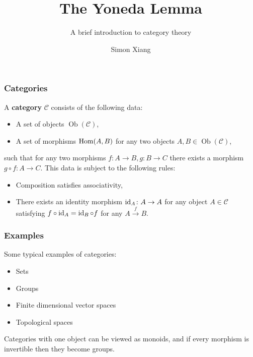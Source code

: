 \documentclass[xcolor=dvipsnames]{beamer}
\title{The Yoneda Lemma}
\subtitle{A brief introduction to category theory}
\author{Simon Xiang}
\institute{University of Texas at Austin}
\begin{document}
 
    \begin{frame}
        \titlepage
    \end{frame}

    \begin{frame}
\frametitle{Categories} 
\begin{definition}[]
    A \textbf{category} $\mathcal{C} $ consists of the following data:
    \begin{itemize}
\item A set
    of objects $\operatorname{Ob}(\mathcal{C} )$,
\item A set
    of morphisms $\operatorname{Hom} (A,B)$ for any two objects $A,B \in \operatorname{Ob}(\mathcal{C} )$,
    \end{itemize}
    such that for any two morphisms $f \colon A \to B, g \colon B \to C$ there exists a morphism $g \circ f \colon A \to C$. This data is subject to the following rules:
    \begin{itemize}
        \item Composition satisfies associativity, 
        \item There exists an identity morphism $\operatorname{id}_A \colon A \to A$ for any object $A \in \mathcal{C} $ satisfying $f\circ \operatorname{id}_A =\operatorname{id}_B\circ f$ for any $A\xrightarrow fB$.
    \end{itemize}
\end{definition}
    \end{frame}

    \begin{frame}
        \frametitle{Examples} 
        \begin{example}
        Some typical examples of categories:
        \begin{itemize}
            \item Sets
            \item Groups
            \item Finite dimensional vector spaces
            \item Topological spaces
        \end{itemize}
        \end{example}
        \begin{example}
            Categories with one object can be viewed as monoids, and if every morphism is invertible then they become groups.
        \end{example}
    \end{frame}
\end{document}
